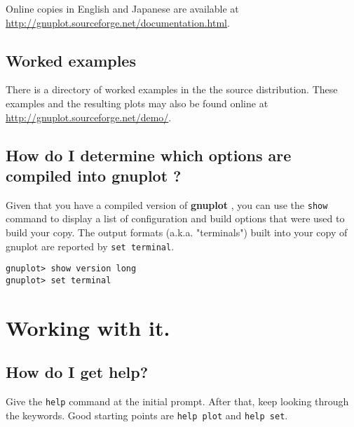 \documentclass[a4paper,11pt]{article}
\def\http#1{{\small\href{http://#1}{\url{http://#1}}}}
\newcommand{\http}[1]%
            {\htmladdnormallink{\latex{\url{http://#1}}%
                    \html{\textit{http://#1}}}%
                {http://#1}%
            }
\newcommand{\gnuplot}{\textbf{gnuplot }}
\begin{document}
Online copies in English and Japanese are available at
\http{gnuplot.sourceforge.net/documentation.html}.

\subsection{Worked examples}

There is a directory of worked examples in the the source distribution.
These examples and the resulting plots may also be found online at
\http{gnuplot.sourceforge.net/demo/}.


\subsection{How do I determine which options are compiled into \gnuplot?}

Given that you have a compiled version of \gnuplot, you can use the
\verb+show+ command to display a list of configuration and build options
that were used to build your copy.  The output formats (a.k.a. "terminals")
built into your copy of gnuplot are reported by \verb+set terminal+.

\small
\begin{verbatim}
gnuplot> show version long
gnuplot> set terminal
\end{verbatim}
\normalsize


\section{Working with it.}

\subsection{How do I get help?}

Give the \verb+help+ command at the initial prompt. After that, keep
looking through the keywords. Good starting points are \verb+help plot+
and \verb+help set+.
\end{document}
